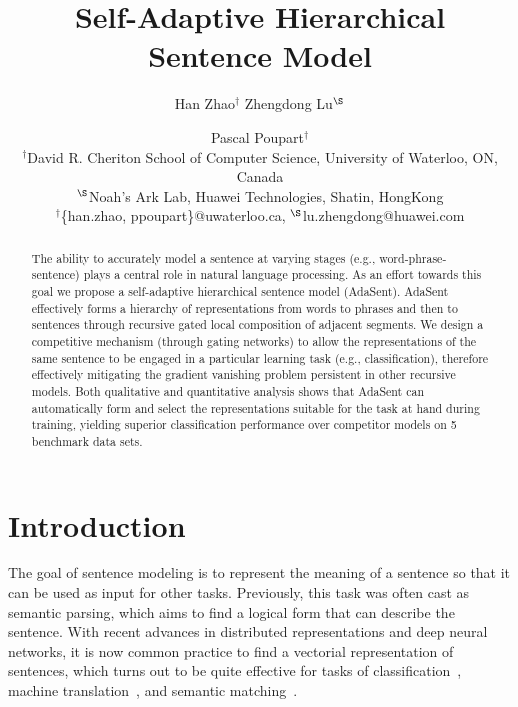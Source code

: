 \documentclass{article}
\title{Self-Adaptive Hierarchical Sentence Model}
\author{Han Zhao$^\dagger$ \quad Zhengdong Lu$^\S$ \and Pascal Poupart$^\dagger$ \\
$^\dagger$David R. Cheriton School of Computer Science, University of Waterloo, ON, Canada\\
$^\S$Noah's Ark Lab, Huawei Technologies, Shatin, HongKong \\
$^\dagger$\{han.zhao, ppoupart\}@uwaterloo.ca, $^\S$lu.zhengdong@huawei.com
}
\theoremstyle{definition}
\begin{document}
\maketitle

\begin{abstract}
The ability to accurately model a sentence at varying stages (e.g., word-phrase-sentence) plays a central role in natural language processing. As an effort towards this goal we propose a self-adaptive hierarchical sentence model (AdaSent). AdaSent effectively forms a hierarchy of representations from words to phrases and then to sentences through recursive gated local composition of adjacent segments. We design a competitive mechanism (through gating networks) to allow the representations of the same sentence to be engaged in a particular learning task (e.g., classification), therefore effectively mitigating the gradient vanishing problem persistent in other recursive models.  Both qualitative and quantitative analysis shows that AdaSent can automatically form and select the representations suitable for the task at hand during training, yielding superior classification performance over competitor models on 5 benchmark data sets.
\end{abstract}

\section{Introduction}
The goal of sentence modeling is to represent the meaning of a sentence so that it can be used as input for other tasks. Previously, this task was often cast as semantic parsing, which aims to find a logical form that can describe the sentence. With recent advances in distributed representations and deep neural networks, it is now common practice to find a vectorial representation of sentences, which turns out to be quite effective for tasks of classification~\cite{kim2014convolutional}, machine translation~\cite{cho2014properties,bahdanau2014neural}, and semantic matching~\cite{hu2014convolutional}.
\end{document}
